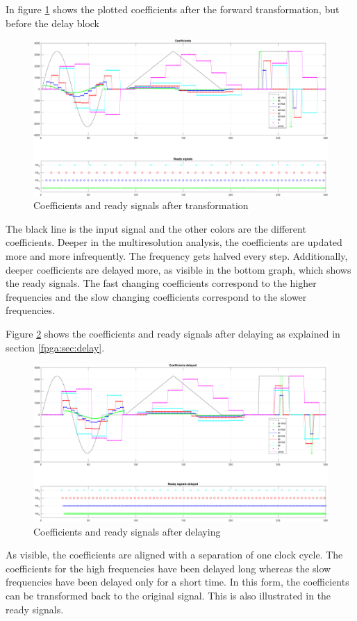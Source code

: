 \begin{refsection}
In figure \ref{fpga:fig:coeff} shows the plotted coefficients after the forward transformation, but before the delay block
\begin{figure}
	\centering
	\includegraphics[width=\textwidth]{papers/fpga/images/coefs_with_step.pdf}
	\caption{Coefficients and ready signals after transformation \label{fpga:fig:coeff}}
\end{figure}
The black line is the input signal and the other colors are the different coefficients.
Deeper in the multiresolution analysis, the coefficients are updated more and more infrequently.
The frequency gets halved every step.
Additionally, deeper coefficients are delayed more, as visible in the bottom graph, which shows the ready signals.
The fast changing coefficients correspond to the higher frequencies and the slow changing coefficients correspond to the slower frequencies.

Figure \ref{fpga:fig:coeff_delayed} shows the coefficients and ready signals after delaying as explained in section \ref{fpga:sec:delay}.
\begin{figure}
	\centering
	\includegraphics[width=\textwidth]{papers/fpga/images/coefs_delayed_with_step.pdf}
	\caption{Coefficients and ready signals after delaying \label{fpga:fig:coeff_delayed}}
\end{figure}
As visible, the coefficients are aligned with a separation of one clock cycle. 
The coefficients for the high frequencies have been delayed long whereas the slow frequencies have been delayed only for a short time. 
In this form, the coefficients can be transformed back to the original signal. 
This is also illustrated in the ready signals.


\end{refsection}

